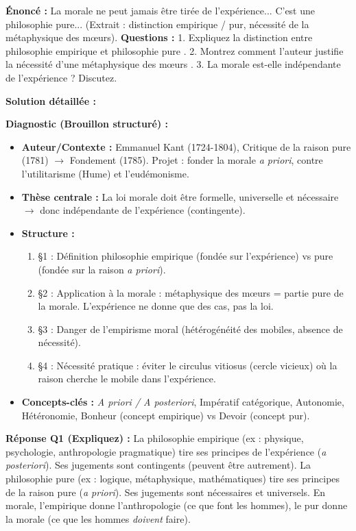 \documentclass[11pt]{article}
\newcommand{\cle}[1]{{\popxbold\color{popdark}#1}}
\begin{document}
\begin{exoresolu}
\textbf{Énoncé :} \og La morale ne peut jamais être tirée de l'expérience... C'est une philosophie pure... \fg (Extrait : distinction empirique / pur, nécessité de la métaphysique des mœurs).
\textbf{Questions :}
1. Expliquez la distinction entre \og philosophie empirique \fg et \og philosophie pure \fg.
2. Montrez comment l'auteur justifie la nécessité d'une \og métaphysique des mœurs \fg.
3. \og La morale est-elle indépendante de l'expérience ? \fg Discutez.

\tcblower
\textbf{Solution détaillée :}

\textbf{Diagnostic (Brouillon structuré) :}
\begin{itemize}
    \item \textbf{Auteur/Contexte :} Emmanuel Kant (1724-1804), Critique de la raison pure (1781) $\rightarrow$ Fondement (1785). Projet : fonder la morale \emph{a priori}, contre l'utilitarisme (Hume) et l'eudémonisme.
    \item \textbf{Thèse centrale :} La loi morale doit être \cle{formelle}, \cle{universelle} et \cle{nécessaire} $\rightarrow$ donc indépendante de l'expérience (contingente).
    \item \textbf{Structure :}
    \begin{enumerate}
        \item §1 : Définition philosophie empirique (fondée sur l'expérience) vs pure (fondée sur la raison \emph{a priori}).
        \item §2 : Application à la morale : \og métaphysique des mœurs \fg = partie pure de la morale. L'expérience ne donne que des cas, pas la loi.
        \item §3 : Danger de l'empirisme moral (hétérogénéité des mobiles, absence de nécessité).
        \item §4 : Nécessité pratique : éviter le \cle{circulus vitiosus} (cercle vicieux) où la raison cherche le mobile dans l'expérience.
    \end{enumerate}
    \item \textbf{Concepts-clés :} \emph{A priori / A posteriori}, \cle{Impératif catégorique}, \cle{Autonomie}, \cle{Hétéronomie}, \cle{Bonheur} (concept empirique) vs \cle{Devoir} (concept pur).
\end{itemize}

\textbf{Réponse Q1 (Expliquez) :}
La \cle{philosophie empirique} (ex : physique, psychologie, anthropologie pragmatique) tire ses principes de l'expérience (\emph{a posteriori}). Ses jugements sont contingents (peuvent être autrement). La \cle{philosophie pure} (ex : logique, métaphysique, mathématiques) tire ses principes de la raison pure (\emph{a priori}). Ses jugements sont nécessaires et universels. En morale, l'empirique donne l'\cle{anthropologie} (ce que font les hommes), le pur donne la \cle{morale} (ce que les hommes \emph{doivent} faire).


\end{exoresolu}
\end{document}
